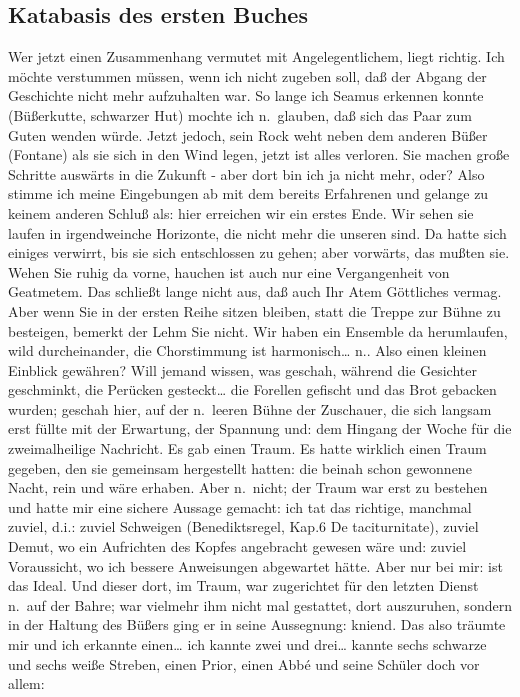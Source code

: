 \documentclass[
]{article}
\author{}
\date{\vspace{-2.5em}}
\begin{document}
\subsection{Katabasis des ersten
Buches}\label{katabasis-des-ersten-buches}

Wer jetzt einen Zusammenhang vermutet mit Angelegentlichem, liegt
richtig. Ich möchte verstummen müssen, wenn ich nicht zugeben soll, daß
der Abgang der Geschichte nicht mehr aufzuhalten war. So lange ich
Seamus erkennen konnte (Büßerkutte, schwarzer Hut) mochte ich
n.~glauben, daß sich das Paar zum Guten wenden würde. Jetzt jedoch, sein
Rock weht neben dem anderen Büßer (Fontane) als sie sich in den Wind
legen, jetzt ist alles verloren. Sie machen große Schritte auswärts in
die Zukunft - aber dort bin ich ja nicht mehr, oder? Also stimme ich
meine Eingebungen ab mit dem bereits Erfahrenen und gelange zu keinem
anderen Schluß als: hier erreichen wir ein erstes Ende. Wir sehen sie
laufen in irgendweinche Horizonte, die nicht mehr die unseren sind. Da
hatte sich einiges verwirrt, bis sie sich entschlossen zu gehen; aber
vorwärts, das mußten sie. Wehen Sie ruhig da vorne, hauchen ist auch nur
eine Vergangenheit von Geatmetem. Das schließt lange nicht aus, daß auch
Ihr Atem Göttliches vermag. Aber wenn Sie in der ersten Reihe sitzen
bleiben, statt die Treppe zur Bühne zu besteigen, bemerkt der Lehm Sie
nicht. Wir haben ein Ensemble da herumlaufen, wild durcheinander, die
Chorstimmung ist harmonisch\ldots{} n.. Also einen kleinen Einblick
gewähren? Will jemand wissen, was geschah, während die Gesichter
geschminkt, die Perücken gesteckt\ldots{} die Forellen gefischt und das
Brot gebacken wurden; geschah hier, auf der n.~leeren Bühne der
Zuschauer, die sich langsam erst füllte mit der Erwartung, der Spannung
und: dem Hingang der Woche für die zweimalheilige Nachricht. Es gab
einen Traum. Es hatte wirklich einen Traum gegeben, den sie gemeinsam
hergestellt hatten: die beinah schon gewonnene Nacht, rein und wäre
erhaben. Aber n.~nicht; der Traum war erst zu bestehen und hatte mir
eine sichere Aussage gemacht: ich tat das richtige, manchmal zuviel,
d.i.: zuviel Schweigen (Benediktsregel, Kap.6 De taciturnitate), zuviel
Demut, wo ein Aufrichten des Kopfes angebracht gewesen wäre und: zuviel
Voraussicht, wo ich bessere Anweisungen abgewartet hätte. Aber nur bei
mir: ist das Ideal. Und dieser dort, im Traum, war zugerichtet für den
letzten Dienst n.~auf der Bahre; war vielmehr ihm nicht mal gestattet,
dort auszuruhen, sondern in der Haltung des Büßers ging er in seine
Aussegnung: kniend. Das also träumte mir und ich erkannte einen\ldots{}
ich kannte zwei und drei\ldots{} kannte sechs schwarze und sechs weiße
Streben, einen Prior, einen Abbé und seine Schüler doch vor allem:
\end{document}
